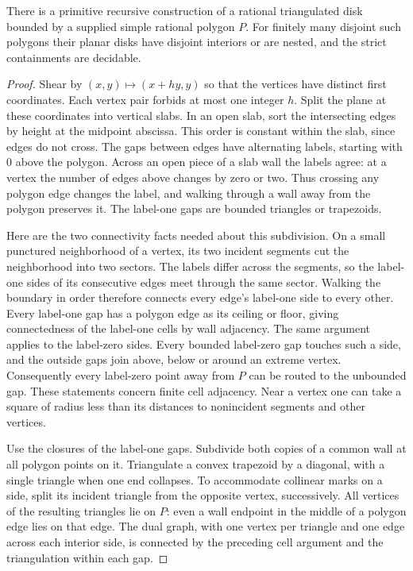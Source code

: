 \begin{lemma}
\label{lem:slab-cap}
There is a primitive recursive construction of a rational triangulated
disk bounded by a supplied simple rational polygon $P$. For finitely
many disjoint such polygons their planar disks have disjoint interiors
or are nested, and the strict containments are decidable.
\end{lemma}
\begin{proof}
Shear by $(x,y)\mapsto(x+hy,y)$ so that the vertices have distinct
first coordinates. Each vertex pair forbids at most one integer $h$.
Split the plane at these coordinates into vertical slabs. In an open slab,
sort the intersecting edges by height at the midpoint abscissa. This order
is constant within the slab, since edges do not cross. The gaps between
edges have alternating labels, starting with $0$ above the polygon.
Across an open piece of a slab wall the labels agree: at a vertex the
number of edges above changes by zero or two. Thus crossing any polygon
edge changes the label, and walking through a wall away from the polygon
preserves it. The label-one gaps are bounded triangles or trapezoids.

Here are the two connectivity facts needed about this subdivision. On a
small punctured neighborhood of a vertex, its two incident segments cut
the neighborhood into two sectors. The labels differ across the segments,
so the label-one sides of its consecutive edges meet through the same
sector. Walking the boundary in order therefore connects every edge's
label-one side to every other. Every label-one gap has a polygon edge
as its ceiling or floor, giving connectedness of the label-one cells by
wall adjacency. The same argument applies to the label-zero sides.
Every bounded label-zero gap touches such a side, and the outside gaps
join above, below or around an extreme vertex. Consequently every
label-zero point away from $P$ can be routed to the unbounded gap.
These statements concern finite cell adjacency. Near a vertex one can
take a square of radius less than its distances to nonincident segments
and other vertices.

Use the closures of the label-one gaps. Subdivide both copies of a
common wall at all polygon points on it. Triangulate a convex
trapezoid by a diagonal, with a single triangle when one end collapses.
To accommodate collinear marks on a side, split its incident triangle
from the opposite vertex, successively. All vertices of the resulting
triangles lie on $P$: even a wall endpoint in the middle of a polygon
edge lies on that edge. The dual graph, with one vertex per triangle
and one edge across each interior side, is connected by the preceding
cell argument and the triangulation within each gap.


\end{proof}
